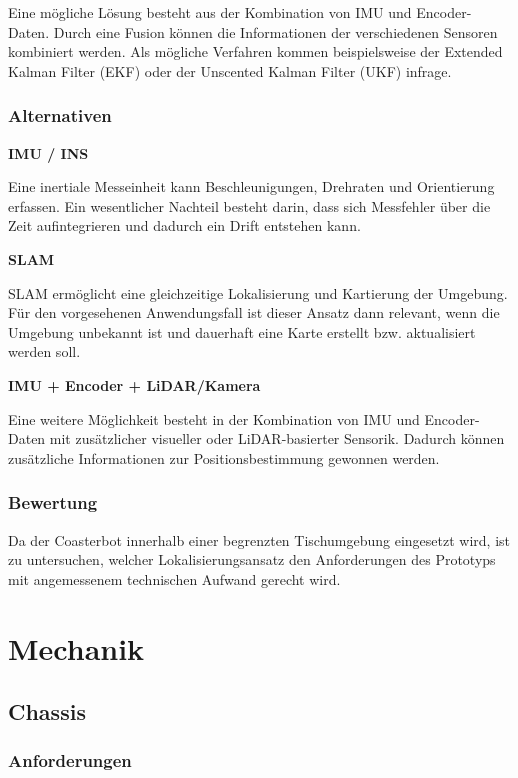 Eine mögliche Lösung besteht aus der Kombination von IMU und
Encoder-Daten. Durch eine Fusion können die Informationen der
verschiedenen Sensoren kombiniert werden. Als mögliche Verfahren kommen
beispielsweise der Extended Kalman Filter (EKF) oder der Unscented
Kalman Filter (UKF) infrage.

\subsubsection{Alternativen}\label{alternativen-4}

\textbf{IMU / INS}

Eine inertiale Messeinheit kann Beschleunigungen, Drehraten und
Orientierung erfassen. Ein wesentlicher Nachteil besteht darin, dass
sich Messfehler über die Zeit aufintegrieren und dadurch ein Drift
entstehen kann.

\textbf{SLAM}

SLAM ermöglicht eine gleichzeitige Lokalisierung und Kartierung der
Umgebung. Für den vorgesehenen Anwendungsfall ist dieser Ansatz dann
relevant, wenn die Umgebung unbekannt ist und dauerhaft eine Karte
erstellt bzw. aktualisiert werden soll.

\textbf{IMU + Encoder + LiDAR/Kamera}

Eine weitere Möglichkeit besteht in der Kombination von IMU und
Encoder-Daten mit zusätzlicher visueller oder LiDAR-basierter Sensorik.
Dadurch können zusätzliche Informationen zur Positionsbestimmung
gewonnen werden.

\subsubsection{Bewertung}\label{bewertung-4}

Da der Coasterbot innerhalb einer begrenzten Tischumgebung eingesetzt
wird, ist zu untersuchen, welcher Lokalisierungsansatz den Anforderungen
des Prototyps mit angemessenem technischen Aufwand gerecht wird.

\section{Mechanik}\label{mechanik}

\subsection{Chassis}\label{chassis}

\subsubsection{Anforderungen}\label{anforderungen}


